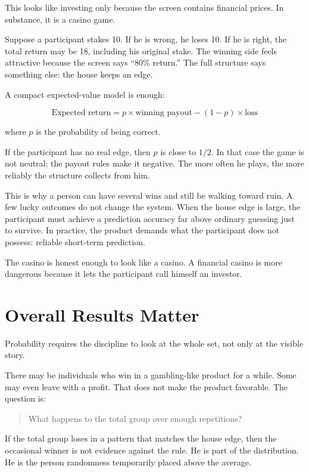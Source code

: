 This looks like investing only because the screen contains financial prices. In substance, it is a casino game.

Suppose a participant stakes 10. If he is wrong, he loses 10. If he is right, the total return may be 18, including his original stake. The winning side feels attractive because the screen says ``80\% return.'' The full structure says something else: the house keeps an edge.

A compact expected-value model is enough:

\[
\text{Expected return}
=
p \times \text{winning payout}
-
(1-p) \times \text{loss}
\]

where \(p\) is the probability of being correct.

If the participant has no real edge, then \(p\) is close to \(1/2\). In that case the game is not neutral; the payout rules make it negative. The more often he plays, the more reliably the structure collects from him.

This is why a person can have several wins and still be walking toward ruin. A few lucky outcomes do not change the system. When the house edge is large, the participant must achieve a prediction accuracy far above ordinary guessing just to survive. In practice, the product demands what the participant does not possess: reliable short-term prediction.

The casino is honest enough to look like a casino. A financial casino is more dangerous because it lets the participant call himself an investor.

\section*{Overall Results Matter}

Probability requires the discipline to look at the whole set, not only at the visible story.

There may be individuals who win in a gambling-like product for a while. Some may even leave with a profit. That does not make the product favorable. The question is:

\begin{quote}
What happens to the total group over enough repetitions?
\end{quote}

If the total group loses in a pattern that matches the house edge, then the occasional winner is not evidence against the rule. He is part of the distribution. He is the person randomness temporarily placed above the average.

